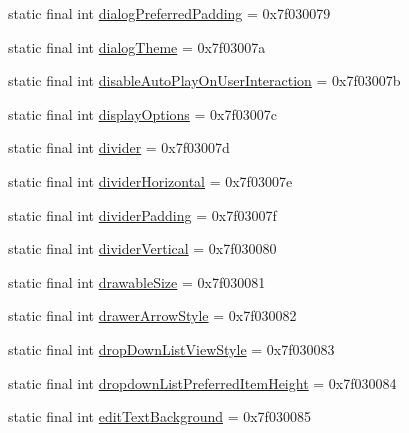 \begin{DoxyCompactItemize}
\item 
static final int \mbox{\hyperlink{classcom_1_1synnapps_1_1carouselview_1_1_r_1_1attr_a43753db72a0e7411d0f0ceaa948623a3}{dialog\+Preferred\+Padding}} = 0x7f030079
\item 
static final int \mbox{\hyperlink{classcom_1_1synnapps_1_1carouselview_1_1_r_1_1attr_a635a1be926cd32a90644330fb72f35ab}{dialog\+Theme}} = 0x7f03007a
\item 
static final int \mbox{\hyperlink{classcom_1_1synnapps_1_1carouselview_1_1_r_1_1attr_a868a03caa5216af031b3ecd5c2c50727}{disable\+Auto\+Play\+On\+User\+Interaction}} = 0x7f03007b
\item 
static final int \mbox{\hyperlink{classcom_1_1synnapps_1_1carouselview_1_1_r_1_1attr_ac1fc760990f6c2a9f0474d0af718ea66}{display\+Options}} = 0x7f03007c
\item 
static final int \mbox{\hyperlink{classcom_1_1synnapps_1_1carouselview_1_1_r_1_1attr_a2de3feeee6c7a1a7dbb61616f808c5b6}{divider}} = 0x7f03007d
\item 
static final int \mbox{\hyperlink{classcom_1_1synnapps_1_1carouselview_1_1_r_1_1attr_ad5a24bc8d04224e101c178241edc85ee}{divider\+Horizontal}} = 0x7f03007e
\item 
static final int \mbox{\hyperlink{classcom_1_1synnapps_1_1carouselview_1_1_r_1_1attr_a5c08c630cc6fce8cb7b5bb9468397909}{divider\+Padding}} = 0x7f03007f
\item 
static final int \mbox{\hyperlink{classcom_1_1synnapps_1_1carouselview_1_1_r_1_1attr_a2123095d20c6719ae69b99d4ad7b8cf4}{divider\+Vertical}} = 0x7f030080
\item 
static final int \mbox{\hyperlink{classcom_1_1synnapps_1_1carouselview_1_1_r_1_1attr_a2588ed65b648030fc61df44953cffd00}{drawable\+Size}} = 0x7f030081
\item 
static final int \mbox{\hyperlink{classcom_1_1synnapps_1_1carouselview_1_1_r_1_1attr_a2ca7ec02ac37c3fc38a4d0c685b5e46c}{drawer\+Arrow\+Style}} = 0x7f030082
\item 
static final int \mbox{\hyperlink{classcom_1_1synnapps_1_1carouselview_1_1_r_1_1attr_a3ec150b43fbf275e35d6e64c81fbffcc}{drop\+Down\+List\+View\+Style}} = 0x7f030083
\item 
static final int \mbox{\hyperlink{classcom_1_1synnapps_1_1carouselview_1_1_r_1_1attr_ae2d65ed8b48cb2af1798386245bffd90}{dropdown\+List\+Preferred\+Item\+Height}} = 0x7f030084
\item 
static final int \mbox{\hyperlink{classcom_1_1synnapps_1_1carouselview_1_1_r_1_1attr_ad03d022d0130c33b184a20bf65713040}{edit\+Text\+Background}} = 0x7f030085

\end{DoxyCompactItemize}
